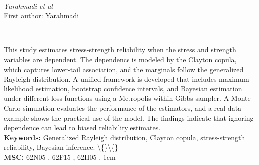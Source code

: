 \documentclass[10pt,twoside]{article}
\begin{document}
\noindent\begin{minipage}[t][\textheight]{\textwidth}
\\[0.35em]
{\itshape Yarahmadi et al}\\[0.2em]
{\footnotesize First author: Yarahmadi}\\[0.45em]
\noindent\rule{\textwidth}{0.3pt}\\[0.4em]
{\footnotesize  This study estimates stress-strength reliability when the stress and strength variables are dependent. The dependence is modeled by the Clayton copula, which captures lower-tail association, and the marginals follow the generalized Rayleigh distribution. A unified framework is developed that includes maximum likelihood estimation, bootstrap confidence intervals, and Bayesian estimation under different loss functions using a Metropolis-within-Gibbs sampler. A Monte Carlo simulation evaluates the performance of the estimators, and a real data example shows the practical use of the model. The findings indicate that ignoring dependence can lead to biased reliability estimates.}\\[0.4em]
{\footnotesize\bfseries Keywords:} {\footnotesize Generalized Rayleigh distribution, Clayton copula, stress-strength reliability, Bayesian inference. \textbackslash\{\}\textbackslash\{\}}\\[0.15em]
{\footnotesize\bfseries MSC:} {\footnotesize 62N05 , 62F15 , 62H05 . 1cm}\\
\vfill
\end{minipage}
\newpage
\end{document}
